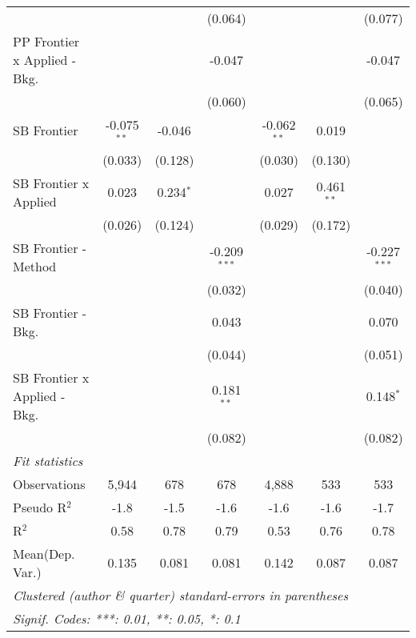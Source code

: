 \begin{tabular}{lcccccc}
                                  &               &             & (0.064)        &               &               & (0.077)\\   
   PP Frontier x Applied - Bkg.   &               &             & -0.047         &               &               & -0.047\\   
                                  &               &             & (0.060)        &               &               & (0.065)\\   
   SB Frontier                    & -0.075$^{**}$ & -0.046      &                & -0.062$^{**}$ & 0.019         &   \\   
                                  & (0.033)       & (0.128)     &                & (0.030)       & (0.130)       &   \\   
   SB Frontier x Applied          & 0.023         & 0.234$^{*}$ &                & 0.027         & 0.461$^{**}$  &   \\   
                                  & (0.026)       & (0.124)     &                & (0.029)       & (0.172)       &   \\   
   SB Frontier - Method           &               &             & -0.209$^{***}$ &               &               & -0.227$^{***}$\\   
                                  &               &             & (0.032)        &               &               & (0.040)\\   
   SB Frontier - Bkg.             &               &             & 0.043          &               &               & 0.070\\   
                                  &               &             & (0.044)        &               &               & (0.051)\\   
   SB Frontier x Applied - Bkg.   &               &             & 0.181$^{**}$   &               &               & 0.148$^{*}$\\   
                                  &               &             & (0.082)        &               &               & (0.082)\\   
   \midrule
   \emph{Fit statistics}\\
   Observations                   & 5,944         & 678         & 678            & 4,888         & 533           & 533\\  
   Pseudo R$^2$                   & -1.8          & -1.5        & -1.6           & -1.6          & -1.6          & -1.7\\  
   R$^2$                          & 0.58          & 0.78        & 0.79           & 0.53          & 0.76          & 0.78\\  
Mean(Dep. Var.) & 0.135 & 0.081 & 0.081 & 0.142 & 0.087 & 0.087 \\
   \midrule \midrule
   \multicolumn{7}{l}{\emph{Clustered (author \& quarter) standard-errors in parentheses}}\\
   \multicolumn{7}{l}{\emph{Signif. Codes: ***: 0.01, **: 0.05, *: 0.1}}\\
\end{tabular}
\par\endgroup
